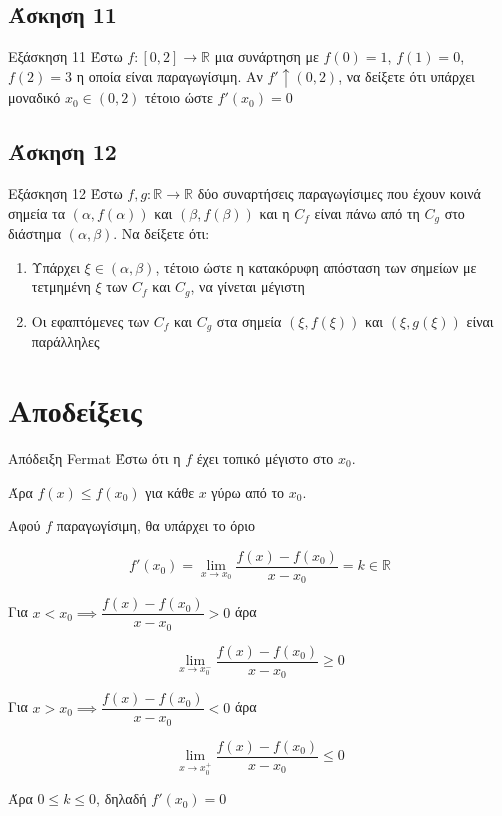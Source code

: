 \documentclass[greek]{beamer}
\begin{document}
\subsection{Άσκηση 11}
\begin{frame}[label=Άσκηση11,,t]{Εξάσκηση 11}
  Έστω $f:[0,2]\to\mathbb{R}$ μια συνάρτηση με $f(0)=1$, $f(1)=0$, $f(2)=3$ η οποία είναι παραγωγίσιμη. Αν $f'\uparrow (0,2)$, να δείξετε ότι υπάρχει μοναδικό $x_0\in (0,2)$ τέτοιο ώστε $f'(x_0)=0$

\end{frame}

\subsection{Άσκηση 12}
\begin{frame}[label=Άσκηση12,t]{Εξάσκηση 12}
  Έστω $f,g:\mathbb{R}\to\mathbb{R}$ δύο συναρτήσεις παραγωγίσιμες που έχουν κοινά σημεία τα $(α,f(α))$ και $(β,f(β))$ και η $C_f$ είναι πάνω από τη $C_g$ στο διάστημα $(α,β)$. Να δείξετε ότι:
  \begin{enumerate}
    \item<1-> Υπάρχει $ξ\in (α,β)$, τέτοιο ώστε η κατακόρυφη απόσταση των σημείων με τετμημένη $ξ$ των $C_f$ και $C_g$, να γίνεται μέγιστη
    \item<2-> Οι εφαπτόμενες των $C_f$ και $C_g$ στα σημεία $(ξ,f(ξ))$ και $(ξ,g(ξ))$ είναι παράλληλες
  \end{enumerate}

\end{frame}


\appendix

\section{Αποδείξεις}
\begin{frame}[label=Απόδειξη1]{Απόδειξη Fermat}
   Έστω ότι η $f$ έχει τοπικό μέγιστο στο $x_0$.

  Άρα $f(x)\le f(x_0)$ για κάθε $x$ γύρω από το $x_0$.

   Αφού $f$ παραγωγίσιμη, θα υπάρχει το όριο

  $$f'(x_0)=\lim\limits_{x \to x_0}{ \dfrac{f(x)-f(x_0)}{x-x_0} }=k\in\mathbb{R}$$

   Για $x<x_0\implies \dfrac{f(x)-f(x_0)}{x-x_0} >0$ άρα

  $$\lim\limits_{x \to x_0^-}{ \dfrac{f(x)-f(x_0)}{x-x_0} }\ge 0$$

   Για $x>x_0\implies \dfrac{f(x)-f(x_0)}{x-x_0} <0$ άρα

  $$\lim\limits_{x \to x_0^+}{ \dfrac{f(x)-f(x_0)}{x-x_0} }\le 0$$

   Άρα $0\le k \le 0$, δηλαδή $f'(x_0)=0$ \hyperlink{Θεώρημα1}{}
\end{frame}
\end{document}
